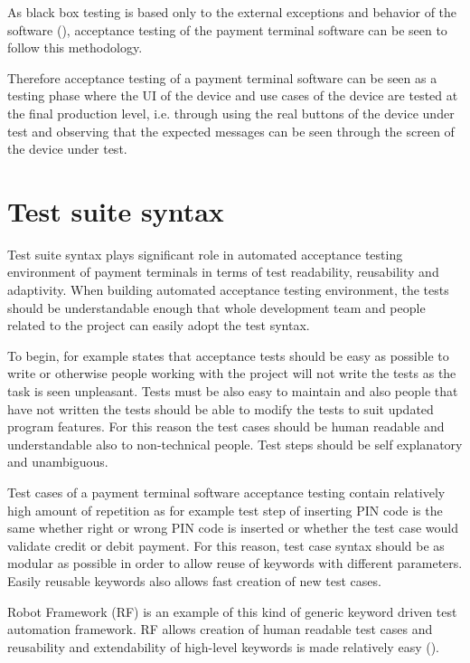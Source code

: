 As black box testing is based only to the external exceptions and behavior of the software (\emph{\cite{khan2012comparative}}), acceptance testing of the payment terminal software can be seen to follow this methodology.

Therefore acceptance testing of a payment terminal software can be seen as a testing phase where the UI of the device and use cases of the device are tested at the final production level, i.e. through using the real buttons of the device under test and observing that the expected messages can be seen through the screen of the device under test.

\section{Test suite syntax}

Test suite syntax plays significant role in automated acceptance testing environment of payment terminals in terms of test readability, reusability and adaptivity. When building automated acceptance testing environment, the tests should be understandable enough that whole development team and people related to the project can easily adopt the test syntax.

To begin, for example \emph{\cite{lowell2003successful}} states that acceptance tests should be easy as possible to write or otherwise people working with the project will not write the tests as the task is seen unpleasant. Tests must be also easy to maintain and also people that have not written the tests should be able to modify the tests to suit updated program features. For this reason the test cases should be human readable and understandable also to non-technical people. Test steps should be self explanatory and unambiguous.

Test cases of a payment terminal software acceptance testing contain relatively high amount of repetition as for example test step of inserting PIN code is the same whether right or wrong PIN code is inserted or whether the test case would validate credit or debit payment. For this reason, test case syntax should be as modular as possible in order to allow reuse of keywords with different parameters. Easily reusable keywords also allows fast creation of new test cases.

Robot Framework (RF) is an example of this kind of generic keyword driven test automation framework. RF allows creation of human readable test cases and reusability and extendability of high-level keywords is made relatively easy (\emph{\cite{stresnjak2011usage}}).

